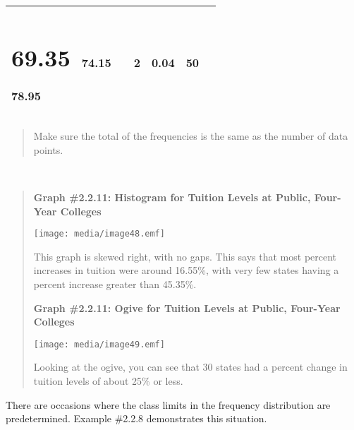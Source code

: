 \documentclass[]{book}
\begin{document}
\begin{longtable}[]{@{}lllllll@{}}
\begin{minipage}[t]{0.11\columnwidth}
{\section{69.35}\label{section-6}}

78.95\strut
\end{minipage} & \begin{minipage}[t]{0.11\columnwidth}\raggedright
74.15\strut
\end{minipage} & \begin{minipage}[t]{0.11\columnwidth}\raggedright
\strut
\end{minipage} & \begin{minipage}[t]{0.11\columnwidth}\raggedright
2\strut
\end{minipage} & \begin{minipage}[t]{0.11\columnwidth}\raggedright
0.04\strut
\end{minipage} & \begin{minipage}[t]{0.11\columnwidth}\raggedright
50\strut
\end{minipage}\tabularnewline
\bottomrule
\end{longtable}

\begin{quote}
Make sure the total of the frequencies is the same as the number of
data points.
\end{quote}

\textbf{\\
}

\begin{quote}
\textbf{Graph \#2.2.11: Histogram for Tuition Levels at Public, Four-Year
Colleges}

\texttt{[image: media/image48.emf]}

This graph is skewed right, with no gaps. This says that most percent
increases in tuition were around 16.55\%, with very few states having a
percent increase greater than 45.35\%.

\textbf{Graph \#2.2.11: Ogive for Tuition Levels at Public, Four-Year
Colleges}

\texttt{[image: media/image49.emf]}

Looking at the ogive, you can see that 30 states had a percent change
in tuition levels of about 25\% or less.
\end{quote}

There are occasions where the class limits in the frequency distribution
are predetermined. Example \#2.2.8 demonstrates this situation.
\end{document}
